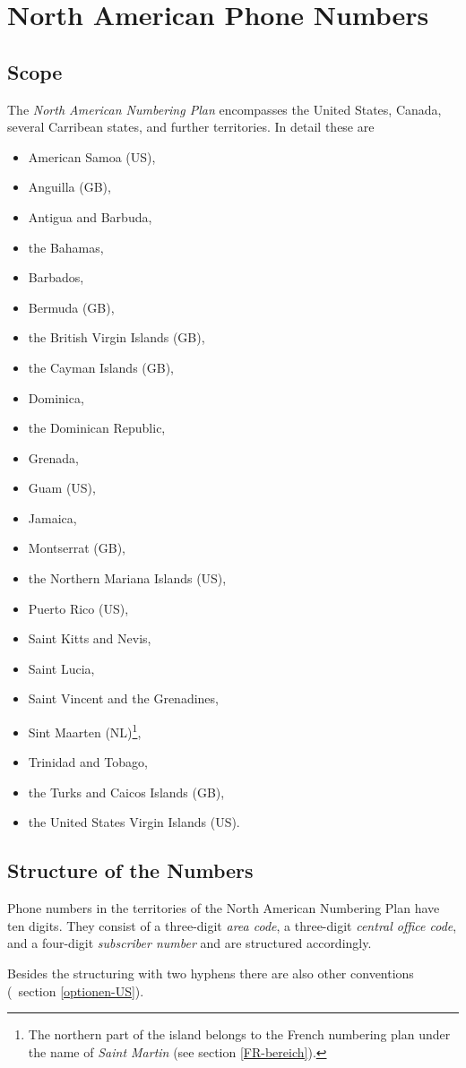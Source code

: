 \documentclass[numbers=noenddot]{scrreprt}
\newcommand{\UeberschriftGeltungsbereich}{\section{Scope}}
\newcommand{\UeberschriftAufbau}{\section{Structure of the Numbers}}
\newcommand*{\vglAbschnitt}[1]{(\cf\ section \ref{#1})}
\newcommand*{\sieheAbschnitt}[1]{(see section \ref{#1})}
\begin{document}
\chapter{North American Phone Numbers} \label{US}
\UeberschriftGeltungsbereich \label{US-bereich}
The \emph{North American Numbering Plan}
\cite{wikipedia-NANP}
encompasses the United States, Canada, several Carribean states, and further territories. In detail these are
\begin{itemize}
\item American Samoa (US),
\item Anguilla (GB),
\item Antigua and Barbuda,
\item the Bahamas,
\item Barbados,
\item Bermuda (GB),
\item the British Virgin Islands (GB),
\item the Cayman Islands (GB),
\item Dominica,
\item the Dominican Republic,
\item Grenada,
\item Guam (US),
\item Jamaica,
\item Montserrat (GB),
\item the Northern Mariana Islands (US),
\item Puerto Rico (US),
\item Saint Kitts and Nevis,
\item Saint Lucia,
\item Saint Vincent and the Grenadines,
\item Sint Maarten (NL)\footnote{The northern part of the island belongs to the French numbering plan under the name of \emph{Saint Martin}
\sieheAbschnitt{FR-bereich}.},
\item Trinidad and Tobago,
\item the Turks and Caicos Islands (GB),
\item the United States Virgin Islands (US).
\end{itemize}

\UeberschriftAufbau
Phone numbers in the territories of the North American Numbering Plan have ten digits. They consist of a three-digit \emph{area code}, a three-digit \emph{central office code}, and a four-digit \emph{subscriber number} and are structured accordingly.
\begin{sidebyside}
\end{sidebyside}
Besides the structuring with two hyphens there are also other conventions
\vglAbschnitt{optionen-US}.
\end{document}
